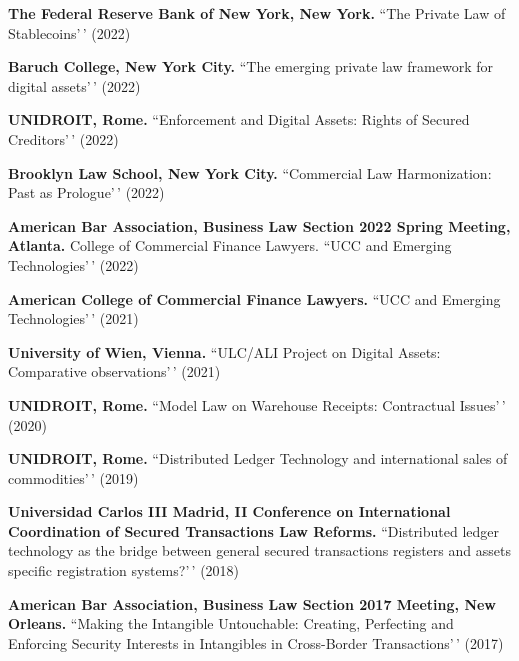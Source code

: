 \documentclass[
  11pt,
  letterpaper]{article}
\begin{document}
\vspace{0.8em}\noindent\textbf{The Federal Reserve Bank of New York, New York.}
``The Private Law of Stablecoins'\,' (2022)

\vspace{0.8em}\noindent\textbf{Baruch College, New York City.} ``The
emerging private law framework for digital assets'\,' (2022)

\vspace{0.8em}\noindent\textbf{UNIDROIT, Rome.} ``Enforcement and
Digital Assets: Rights of Secured Creditors'\,' (2022)

\vspace{0.8em}\noindent\textbf{Brooklyn Law School, New York City.}
``Commercial Law Harmonization: Past as Prologue'\,' (2022)

\vspace{0.8em}\noindent\textbf{American Bar Association, Business Law Section 2022 Spring Meeting, Atlanta.}
College of Commercial Finance Lawyers. ``UCC and Emerging
Technologies'\,' (2022)

\vspace{0.8em}\noindent\textbf{American College of Commercial Finance Lawyers.}
``UCC and Emerging Technologies'\,' (2021)

\vspace{0.8em}\noindent\textbf{University of Wien, Vienna.} ``ULC/ALI
Project on Digital Assets: Comparative observations'\,' (2021)

\vspace{0.8em}\noindent\textbf{UNIDROIT, Rome.} ``Model Law on Warehouse
Receipts: Contractual Issues'\,' (2020)

\vspace{0.8em}\noindent\textbf{UNIDROIT, Rome.} ``Distributed Ledger
Technology and international sales of commodities'\,' (2019)

\vspace{0.8em}\noindent\textbf{Universidad Carlos III Madrid, II Conference on International Coordination of Secured Transactions Law Reforms.}
``Distributed ledger technology as the bridge between general secured
transactions registers and assets specific registration systems?'\,'
(2018)

\vspace{0.8em}\noindent\textbf{American Bar Association, Business Law Section 2017 Meeting, New Orleans.}
``Making the Intangible Untouchable: Creating, Perfecting and Enforcing
Security Interests in Intangibles in Cross-Border Transactions'\,'
(2017)
\end{document}
